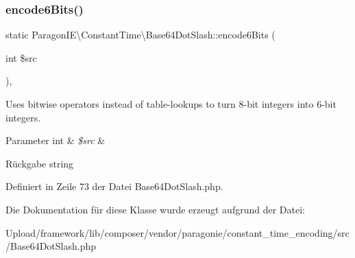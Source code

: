 \subsubsection{\texorpdfstring{encode6\+Bits()}{encode6Bits()}}
{\footnotesize\ttfamily static Paragon\+I\+E\textbackslash{}\+Constant\+Time\textbackslash{}\+Base64\+Dot\+Slash\+::encode6\+Bits (\begin{DoxyParamCaption}\item[{int}]{\$src }\end{DoxyParamCaption})\hspace{0.3cm}{\ttfamily [static]}, {\ttfamily [protected]}}

Uses bitwise operators instead of table-\/lookups to turn 8-\/bit integers into 6-\/bit integers.


\begin{DoxyParams}[1]{Parameter}
int & {\em \$src} & \\
\hline
\end{DoxyParams}
\begin{DoxyReturn}{Rückgabe}
string 
\end{DoxyReturn}


Definiert in Zeile 73 der Datei Base64\+Dot\+Slash.\+php.



Die Dokumentation für diese Klasse wurde erzeugt aufgrund der Datei\+:\begin{DoxyCompactItemize}
\item 
Upload/framework/lib/composer/vendor/paragonie/constant\+\_\+time\+\_\+encoding/src/Base64\+Dot\+Slash.\+php\end{DoxyCompactItemize}
